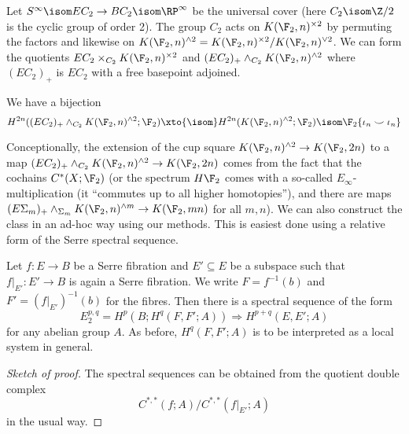 Let $S^\infty \isom E C_2 \to B C_2 \isom \RP^\infty$ be the universal cover (here $C_2 \isom \Zn{2}$ is the cyclic group of order 2).
The group $C_2$ acts on $K(\F_2, n)^{\times 2}$ by permuting the factors and likewise on $K(\F_2, n)^{\wedge 2} = K(\F_2, n)^{\times 2} / K(\F_2, n)^{\vee 2}$.
We can form the quotients $E C_2 \times_{C_2} K(\F_2, n)^{\times 2}$ and $(E C_2)_{+} \wedge_{C_2} K(\F_2, n)^{\wedge 2}$ where $(E C_2)_{+}$ is $E C_2$ with a free basepoint adjoined.
\begin{proposition}
	We have a bijection
	\begin{equation*}
		H^{2n}((E C_2)_{+} \wedge_{C_2} K(\F_2, n)^{\wedge 2}; \F_2) \xto{\isom} H^{2n}(K(\F_2, n)^{\wedge 2}; \F_2) \isom \F_2\{\iota_n \smile \iota_n\}
	\end{equation*}
\end{proposition}
Conceptionally, the extension of the cup square $K(\F_2, n)^{\wedge 2} \to K(\F_2, 2n)$ to a map $(E C_2)_{+} \wedge_{C_2} K(\F_2, n)^{\wedge 2} \to K(\F_2, 2n)$ comes from the fact that the cochains $C^*(X; \F_2)$ (or the spectrum $H \F_2$ comes with a so-called $E_\infty$-multiplication (it \enquote{commutes up to all higher homotopies}), and there are maps $(E \Sigma_m)_{+} \wedge_{\Sigma_m} K(\F_2, n)^{\wedge m} \to K(\F_2, m n)$ for all $m, n$).
We can also construct the class in an ad-hoc way using our methods.
This is easiest done using a relative form of the Serre spectral sequence.
\begin{proposition}
	Let $f\colon E \to B$ be a Serre fibration and $E' \subseteq E$ be a subspace such that $f|_{E'}\colon E' \to B$ is again a Serre fibration.
	We write $F = f^{-1}(b)$ and $F' = (f|_{E'})^{-1}(b)$ for the fibres.
	Then there is a spectral sequence of the form
	\begin{equation*}
		E_2^{p, q} = H^p(B; H^q(F, F'; A)) \Rightarrow H^{p + q}(E, E'; A)
	\end{equation*}
	for any abelian group $A$.
	As before, $H^q(F, F'; A)$ is to be interpreted as a local system in general.
\end{proposition}
\begin{proof}[Sketch of proof]
	The spectral sequences can be obtained from the quotient double complex
	\begin{equation*}
		C^{*, *}(f; A) / C^{*, *}(f|_{E'}; A)
	\end{equation*}
	in the usual way.
\end{proof}

